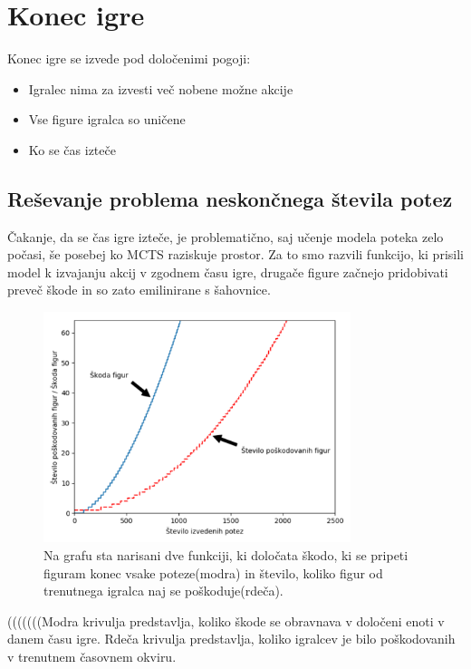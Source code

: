 \documentclass[a4paper, 12pt]{book}
\begin{document}
\section{Konec igre}

Konec igre se izvede pod določenimi pogoji:
\begin{itemize}
	\item Igralec nima za izvesti več nobene možne akcije
	\item Vse figure igralca so uničene
	\item Ko se čas izteče
\end{itemize}


\subsection{Reševanje problema neskončnega števila potez}
Čakanje, da se čas igre izteče, je problematično, saj učenje modela poteka zelo počasi, še posebej ko MCTS raziskuje prostor.
Za to smo razvili funkcijo, ki prisili model k izvajanju akcij v zgodnem času igre, drugače figure začnejo pridobivati preveč škode in so zato emilinirane s šahovnice.


\begin{figure}[h]
	\begin{center}
		\includegraphics[width=0.8\textwidth]{destroy_formula_2018_10_20.pdf}
	\end{center}
	\caption{Na grafu sta narisani dve funkciji, ki določata škodo, ki se pripeti figuram konec vsake poteze(modra) in število, koliko figur od trenutnega igralca naj se poškoduje(rdeča).}
	\label{destroy_formula_2018_10_20}
\end{figure}

(((((((Modra krivulja predstavlja, koliko škode se obravnava v določeni enoti v danem času igre. Rdeča krivulja predstavlja, koliko igralcev je bilo poškodovanih v trenutnem časovnem okviru.
\end{document}
